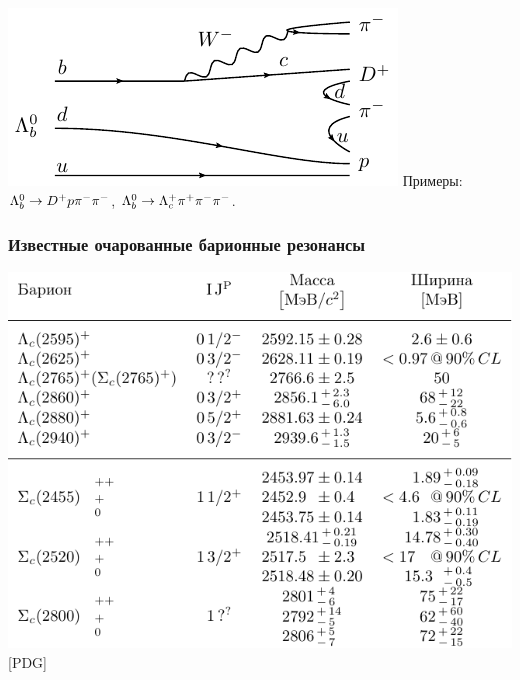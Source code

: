 \documentclass[10pt]{beamer}
\def\bottomleft#1#2{\phantom{#1}\hfill#2\hfill#1}
\begin{document}
\begin{frame}[label=introduction]
{    \vfill
    \includegraphics[width=\linewidth]{figures/diagram-lb2dppipi-bold}
  }
  \vfill \centering Примеры:
  \hspace{2ex} ${\Lambda_b^0}\to{D^+}{p}{\pi^-}{\pi^-}$,
  \hspace{2ex} ${\Lambda_b^0}\to{\Lambda_c^+}{\pi^+}{\pi^-}{\pi^-}$.
\end{frame}%

\begin{frame}[label=resonances]%
  \frametitle{Известные очарованные барионные резонансы}
  \centering
  \bottomleft{[PDG]}{
    \includegraphics[width=.8\linewidth]{figures/resonances-table}
  }
\end{frame}%
\end{document}
